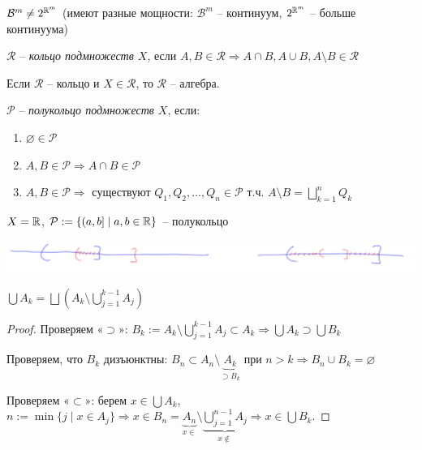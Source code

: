 \begin{remark}
    $\mathcal{B}^m\not = 2^{\mathbb{R}^m}$ (имеют разные мощности: $\mathcal{B}^m$ – континуум, $2^{\mathbb{R}^m}$ – больше континуума)
\end{remark}

\begin{definition}
    $\mathcal{R}$ – \textit{кольцо подмножеств $X$}, если $A, B\in \mathcal{R}\Rightarrow A \cap B,  A \cup B,  A \setminus B\in \mathcal{R}$
\end{definition}

\begin{remark}
    Если $\mathcal{R}$ – кольцо и $X\in \mathcal{R}$, то $\mathcal{R}$ – алгебра.
\end{remark}

\begin{definition}
    $\mathcal{P}$ – \textit{полукольцо подмножеств $X$}, если:
    \begin{enumerate}
        \item $\varnothing \in \mathcal{P}$
        \item $A, B \in \mathcal{P}\Rightarrow A \cap B \in \mathcal{P}$
        \item $A, B \in \mathcal{P}\Rightarrow$ существуют $Q_1, Q_2, ..., Q_n\in \mathcal{P}$ 
            т.ч. $A\setminus B =\bigsqcup\limits_{k=1}^n Q_k$
    \end{enumerate}
\end{definition}

\begin{example}
    $X=\mathbb{R}$, $\mathcal{P}:=\{ (a, b] \mid a, b\in \mathbb{R}\}$ – полукольцо

    \includegraphics[width=0.7\linewidth]{images/23-09-07-3.png}
\end{example}

\begin{lemma}
    $\bigcup A_k=\bigsqcup (A_k \setminus \bigcup\limits_{j=1}^{k - 1} A_j)$ 
\end{lemma}

\begin{proof} Проверяем «$\supset$»: $B_k := A_k \setminus \bigcup\limits_{j=1}^{k-1} A_j \subset A_k \Rightarrow \bigcup A_k \supset \bigcup B_k$

    Проверяем, что $B_k$ дизъюнктны: $B_n \subset A_n \setminus \underbrace{A_k}_{\supset B_k}$ при $n>k\Rightarrow B_n \cup B_k = \varnothing$

    Проверяем «$\subset$»: берем $x\in \bigcup A_k$, $n:=\min \{j\mid x\in A_j\}\Rightarrow x\in B_n=\underbrace{A_n}_{x\in}\setminus \underbrace{\bigcup\limits_{j=1}^{n-1} A_j}_{x\not\in} 
    \Rightarrow x\in \bigcup B_k$.
\end{proof}

